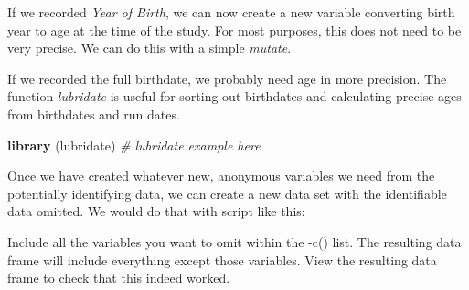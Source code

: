 \documentclass[12pt,]{book}
\newenvironment{Shaded}{\begin{snugshade}}{\end{snugshade}}
\newcommand{\KeywordTok}[1]{\textcolor[rgb]{0.13,0.29,0.53}{\textbf{#1}}}
\newcommand{\DataTypeTok}[1]{\textcolor[rgb]{0.13,0.29,0.53}{#1}}
\newcommand{\DecValTok}[1]{\textcolor[rgb]{0.00,0.00,0.81}{#1}}
\newcommand{\StringTok}[1]{\textcolor[rgb]{0.31,0.60,0.02}{#1}}
\newcommand{\CommentTok}[1]{\textcolor[rgb]{0.56,0.35,0.01}{\textit{#1}}}
\newcommand{\OperatorTok}[1]{\textcolor[rgb]{0.81,0.36,0.00}{\textbf{#1}}}
\newcommand{\NormalTok}[1]{#1}
\theoremstyle{definition}
\theoremstyle{definition}
\theoremstyle{definition}
\theoremstyle{remark}
\begin{document}
If we recorded \emph{Year of Birth}, we can now create a new variable
converting birth year to age at the time of the study. For most
purposes, this does not need to be very precise. We can do this with a
simple \emph{mutate}.

\begin{Shaded}
\end{Shaded}

If we recorded the full birthdate, we probably need age in more
precision. The function \emph{lubridate} is useful for sorting out
birthdates and calculating precise ages from birthdates and run dates.

\begin{Shaded}
\begin{Highlighting}[]
\KeywordTok{library}\NormalTok{ (lubridate)}
\CommentTok{# lubridate example here}
\end{Highlighting}
\end{Shaded}

Once we have created whatever new, anonymous variables we need from the
potentially identifying data, we can create a new data set with the
identifiable data omitted. We would do that with script like this:

\begin{Shaded}
\end{Shaded}

Include all the variables you want to omit within the -c() list. The
resulting data frame will include everything except those variables.
View the resulting data frame to check that this indeed worked.
\end{document}
